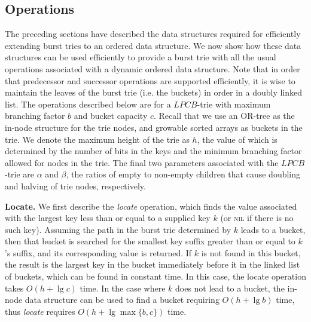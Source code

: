 \documentclass[]{acmtrans2m}
\begin{document}
\subsection{Operations}
\label{operations}

The preceding sections have described the data structures required for efficiently extending burst tries to 
an ordered data structure. We now show how these data structures can be used efficiently to provide a 
burst trie with all the usual operations associated with a dynamic ordered data structure. 
Note that in order that predecessor and successor operations are supported efficiently, it is wise to
maintain the leaves of the burst trie (i.e. the buckets) in order in a doubly linked list.
The operations described below are for a $LPCB$-trie with maximum branching factor $b$ and bucket capacity $c$. Recall
that we use an OR-tree as the in-node structure for the trie nodes, and growable sorted arrays as buckets in the trie.
We denote the maximum height of the trie as $h$, the value of which is determined by the number of bits in the keys
and the minimum branching factor allowed for nodes in the trie. The final two parameters associated with the $LPCB$-trie
are $\alpha$ and $\beta$, the ratios of empty to non-empty children that cause doubling and halving of
trie nodes, respectively.

\textbf{Locate.} We first describe the \textit{locate} operation, which finds the value associated  
with the largest key less than or equal to a supplied key $k$ (or \textsc{nil} if there is no such key).
Assuming the path in the burst trie determined by $k$ leads to a bucket, then that bucket is searched for
the smallest key suffix greater than or equal to $k$'s suffix, and its corresponding value is returned. If $k$ is not
found in this bucket, the result is the largest key in the bucket immediately before it in the linked list of buckets, which
can be found in constant time.
In this case, the locate operation takes $O(h + \lg c)$ time. In the case where $k$ does not lead to a bucket, the in-node data structure can be
used to find a bucket requiring $O(h + \lg b)$ time, thus \textit{locate} requires $O(h + \lg \max \lbrace b, c \rbrace)$ time.
\end{document}
